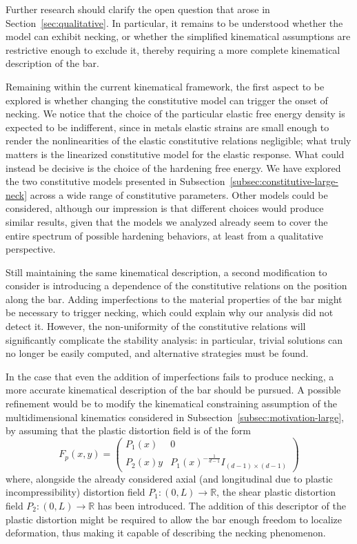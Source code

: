\documentclass[a4paper,10pt,oneside]{amsbook}
\numberwithin{section}{chapter}
\numberwithin{equation}{chapter}
\theoremstyle{definition}
\begin{document}
Further research should clarify the open question that arose in Section~\ref{sec:qualitative}. In particular, it remains to be understood whether the model can exhibit necking, or whether the simplified kinematical assumptions are restrictive enough to exclude it, thereby requiring a more complete kinematical description of the bar.

Remaining within the current kinematical framework, the first aspect to be explored is whether changing the constitutive model can trigger the onset of necking. We notice that the choice of the particular elastic free energy density is expected to be indifferent, since in metals elastic strains are small enough to render the nonlinearities of the elastic constitutive relations negligible; what truly matters is the linearized constitutive model for the elastic response. What could instead be decisive is the choice of the hardening free energy.  We have explored the two constitutive models presented in Subsection~\ref{subsec:constitutive-large-neck} across a wide range of constitutive parameters. Other models could be considered, although our impression is that different choices would produce similar results, given that the models we analyzed already seem to cover the entire spectrum of possible hardening behaviors, at least from a qualitative perspective.

Still maintaining the same kinematical description, a second modification to consider is introducing a dependence of the constitutive relations on the position along the bar. Adding imperfections to the material properties of the bar might be necessary to trigger necking, which could explain why our analysis did not detect it. However, the non-uniformity of the constitutive relations will significantly complicate the stability analysis: in particular, trivial solutions can no longer be easily computed, and alternative strategies must be found.

In the case that even the addition of imperfections fails to produce necking, 
a more accurate kinematical description of the bar should be pursued. A possible 
refinement would be to modify the kinematical constraining assumption of the 
multidimensional kinematics considered in Subsection~\ref{subsec:motivation-large}, 
by assuming that the plastic distortion field is of the form
\[
F_p(x,y)=\begin{pmatrix}
P_1(x) & 0 \\
P_2(x)y & P_1(x)^{-\frac{1}{d-1}}I_{(d-1)\times(d-1)}
\end{pmatrix}
\]
where, alongside the already considered axial (and longitudinal due to plastic 
incompressibility) distortion field $P_1\colon(0,L)\to\mathbb{R}$, the shear 
plastic distortion field $P_2 \colon(0,L)\to\mathbb{R}$ has been introduced. 
The addition of this descriptor of the plastic distortion might be required to 
allow the bar enough freedom to localize deformation, thus making it 
capable of describing the necking phenomenon.
\end{document}
